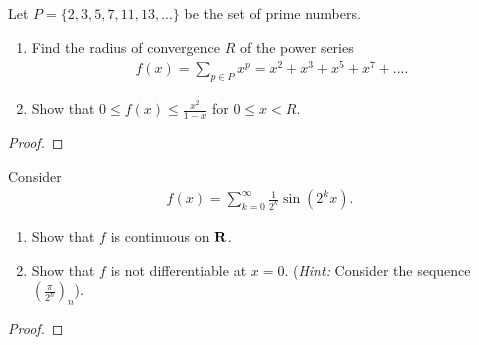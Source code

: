 \documentclass[11pt,twoside,openany]{memoir}
\begin{document}
\newpage
\fancyhead[L]{\scalebox{0.9}{Series of Functions}}
\fancyhead[R]{\scalebox{0.9}{Appeared on: S16}}
\begin{problem}
    Let $P = \{2,3,5,7,11,13,...\}$ be the set of prime numbers.
    \begin{enumerate}[label = (\arabic*)]
        \item Find the radius of convergence $R$ of the power series
        \begin{equation*}
        \begin{split}
            f(x) = \sum_{p \in P}x^p = x^2 + x^3 + x^5 + x^7 + ... .
        \end{split}
        \end{equation*}

        \item Show that $0 \leq f(x) \leq \frac{x^2}{1-x}$ for $0 \leq x  < R$.
    \end{enumerate}
\end{problem}
\begin{proof}
\end{proof}

\newpage
\fancyhead[L]{\scalebox{0.9}{Series of Functions}}
\fancyhead[R]{\scalebox{0.9}{Appeared on: F15}}
\begin{problem}
    Consider 
        \begin{equation*}
        \begin{split}
            f(x) = \sum_{k = 0}^\infty \frac{1}{2^k}\sin (2^k x).
        \end{split}
        \end{equation*}
    \begin{enumerate}[label = (\arabic*)]
        \item Show that $f$ is continuous on $\mathbf{R}$.
        \item Show that $f$ is not differentiable at $x = 0$. (\textit{Hint:} Consider the sequence $\left( \frac{\pi}{2^n} \right)_n$).
    \end{enumerate}
\end{problem}
\begin{proof}
\end{proof}
\end{document}
